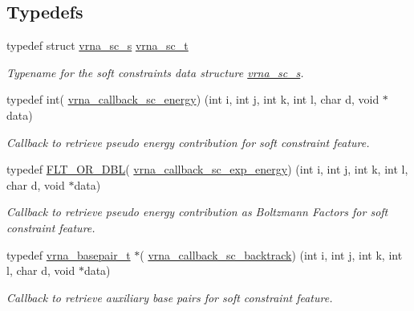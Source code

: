 \subsection*{Typedefs}
\begin{DoxyCompactItemize}
\item 
\hypertarget{group__soft__constraints_ga75401ce219ef8dbcceb672db82d434c6}{}typedef struct \hyperlink{group__soft__constraints_structvrna__sc__s}{vrna\+\_\+sc\+\_\+s} \hyperlink{group__soft__constraints_ga75401ce219ef8dbcceb672db82d434c6}{vrna\+\_\+sc\+\_\+t}\label{group__soft__constraints_ga75401ce219ef8dbcceb672db82d434c6}

\begin{DoxyCompactList}\small\item\em Typename for the soft constraints data structure \hyperlink{group__soft__constraints_structvrna__sc__s}{vrna\+\_\+sc\+\_\+s}. \end{DoxyCompactList}\item 
typedef int( \hyperlink{group__soft__constraints_gaf38062858ac25fd5e240c2c3b0b0b780}{vrna\+\_\+callback\+\_\+sc\+\_\+energy}) (int i, int j, int k, int l, char d, void $\ast$data)
\begin{DoxyCompactList}\small\item\em Callback to retrieve pseudo energy contribution for soft constraint feature. \end{DoxyCompactList}\item 
typedef \hyperlink{group__data__structures_ga31125aeace516926bf7f251f759b6126}{F\+L\+T\+\_\+\+O\+R\+\_\+\+D\+B\+L}( \hyperlink{group__soft__constraints_ga2eade8745c163a553763be4cfe2a679b}{vrna\+\_\+callback\+\_\+sc\+\_\+exp\+\_\+energy}) (int i, int j, int k, int l, char d, void $\ast$data)
\begin{DoxyCompactList}\small\item\em Callback to retrieve pseudo energy contribution as Boltzmann Factors for soft constraint feature. \end{DoxyCompactList}\item 
typedef \hyperlink{group__data__structures_gac8c5669d3fb813cacf506489689305ce}{vrna\+\_\+basepair\+\_\+t} $\ast$( \hyperlink{group__soft__constraints_gaa216f513c3b0bd6fe5807dd0c53a8e5a}{vrna\+\_\+callback\+\_\+sc\+\_\+backtrack}) (int i, int j, int k, int l, char d, void $\ast$data)
\begin{DoxyCompactList}\small\item\em Callback to retrieve auxiliary base pairs for soft constraint feature. \end{DoxyCompactList}\end{DoxyCompactItemize}
